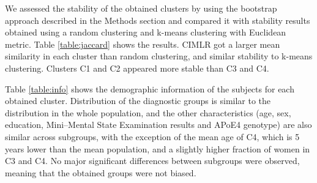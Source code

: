 We assessed the stability of the obtained clusters by using the bootstrap approach described in the Methods section and compared it with stability results obtained using a random clustering and k-means clustering with Euclidean metric. Table \ref{table:jaccard} shows the results. CIMLR got a larger mean similarity in each cluster than random clustering, and similar stability to k-means clustering. Clusters C1 and C2 appeared more stable than C3 and C4. \\

\begin{table}[!htbp]
\centering
{}
\caption[Stability tests.]{Stability tests for the clustering, compared to random clustering and k-means clustering using Euclidian distance. Reported result is mean similarity.}
\label{table:jaccard}
\end{table}

Table \ref{table:info} shows the demographic information of the subjects for each obtained cluster. Distribution of the diagnostic groups is similar to the distribution in the whole population, and the other characteristics (age, sex, education, Mini–Mental State Examination results and APoE4 genotype) are also similar across subgroups, with the exception of the mean age of C4, which is 5 years lower than the mean population, and a slightly higher fraction of women in C3 and C4. No major significant differences between subgroups were observed, meaning that the obtained groups were not biased. \\


